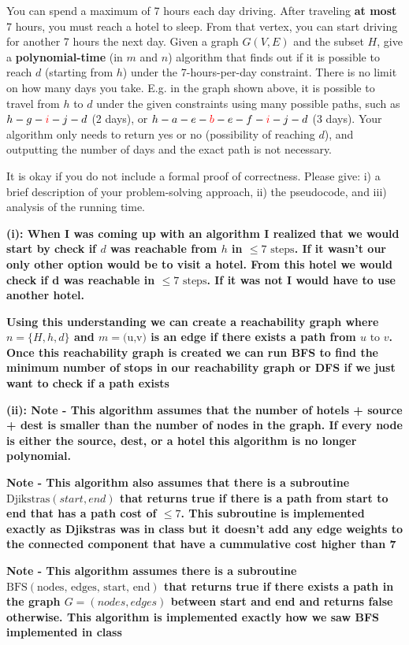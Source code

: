 \documentclass[addpoints]{exam}
\begin{document}
\begin{questions}
You can spend a maximum of 7 hours each day driving. After traveling \textbf{at most} 7 hours, you must reach a hotel to sleep. From that vertex, you can start driving for another 7 hours the next day. Given a graph $G(V,E)$ and the subset $H$, give a \textbf{polynomial-time} (in $m$ and $n$) algorithm that finds out if it is possible to reach $d$ (starting from $h$) under the 7-hours-per-day constraint. There is no limit on how many days you take. E.g. in the graph shown above, it is possible to travel from $h$ to $d$ under the given constraints using many possible paths, such as $h-g-\textcolor{red}{i}-j-d$ (2 days), or $h-a-e-\textcolor{red}{b}-e-f-\textcolor{red}{i}-j-d$ (3 days). Your algorithm only needs to return yes or no (possibility of reaching $d$), and outputting the number of days and the exact path is not necessary.

It is okay if you do not include a formal proof of correctness. Please give: i) a brief description of your problem-solving approach, ii) the pseudocode, and iii) analysis of the running time. 

\textbf{(i): When I was coming up with an algorithm I realized that we would start by check if $d$ was reachable from $h$ in $\le 7 \text{ steps}$. If it wasn't our only other option would be to visit a hotel. From this hotel we would check if d was reachable in $\le 7 \text{ steps}$. If it was not I would have to use another hotel.}

\textbf{Using this understanding we can create a reachability graph where $n = \{H,h,d\} $ and $m = \text{(u,v)}$ is an edge if there exists a path from $u \text{ to } v$. Once this reachability graph is created we can run BFS to find the minimum number of stops in our reachability graph or DFS if we just want to check if a path exists}

\textbf{(ii): Note - This algorithm assumes that the number of hotels + source + dest is smaller than the number of nodes in the graph. If every node is either the source, dest, or a hotel this algorithm is no longer polynomial.}

\textbf{Note - This algorithm also assumes that there is a subroutine $\text{Djikstras}(start, end)$ that returns true if there is a path from start to end that has a path cost of $\le 7$. This subroutine is implemented exactly as Djikstras was in class but it doesn't add any edge weights to the connected component that have a cummulative cost higher than 7}

\textbf{Note - This algorithm assumes there is a subroutine $\text{BFS}(\text{nodes, edges, start, end})$ that returns true if there exists a path in the graph $G=(nodes, edges)$ between start and end and returns false otherwise. This algorithm is implemented exactly how we saw BFS implemented in class}


\end{questions}
\end{document}
